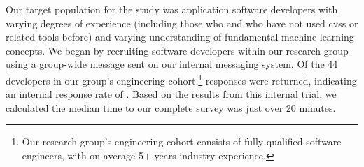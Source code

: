 Our target population for the study was application software developers with varying degrees of experience (including those who and who have not used \glspl{cvs} or related tools before) and varying understanding of fundamental machine learning concepts. We began by recruiting software developers within our research group using a group-wide message sent on our internal messaging system. Of the 44 developers in our group's engineering cohort,\footnote{Our research group's engineering cohort consists of fully-qualified software engineers, with on average 5+ years industry experience.} \SurveyParticipantsInternal{} responses were returned, indicating an internal response rate of \SurveyParticipantsInternalResponseRate{}. Based on the \SurveyParticipantsInternal{} results from this internal trial, we calculated the median time to our complete survey was just over 20 minutes.


